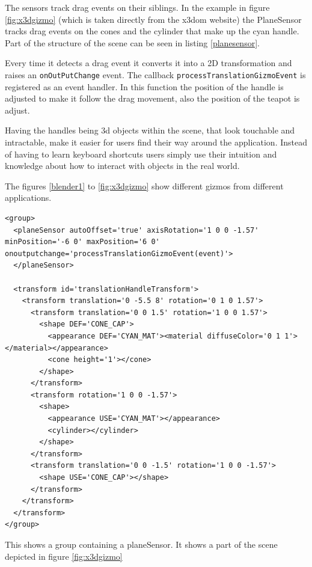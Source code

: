 The sensors track drag events on their siblings. In the example in figure
\ref{fig:x3dgizmo} (which is taken directly from the x3dom website) the
PlaneSensor tracks drag events on the cones and the cylinder that make up the
cyan handle. Part of the structure of the scene can be seen in listing
\ref{planesensor}.

Every time it detects a drag event it converts it into a 2D
transformation and raises an \texttt{onOutPutChange} event. The callback
\texttt{processTranslationGizmoEvent} is registered as an event handler.
In this function the position of the handle is adjusted to make it
follow the drag movement, also the position of the teapot is adjust.

Having the handles being 3d objects within the scene, that look
touchable and intractable, make it easier for users find their way
around the application. Instead of having to learn keyboard shortcuts
users simply use their intuition and knowledge about how to interact with
objects in the real world.

The figures \ref{blender1} to \ref{fig:x3dgizmo} show different gizmos from
different applications.

\begin{listing}
  \begin{verbatim}
<group>
  <planeSensor autoOffset='true' axisRotation='1 0 0 -1.57' minPosition='-6 0' maxPosition='6 0' onoutputchange='processTranslationGizmoEvent(event)'>
  </planeSensor>

  <transform id='translationHandleTransform'>
    <transform translation='0 -5.5 8' rotation='0 1 0 1.57'>
      <transform translation='0 0 1.5' rotation='1 0 0 1.57'>
        <shape DEF='CONE_CAP'>
          <appearance DEF='CYAN_MAT'><material diffuseColor='0 1 1'></material></appearance>
          <cone height='1'></cone>
        </shape>
      </transform>
      <transform rotation='1 0 0 -1.57'>
        <shape>
          <appearance USE='CYAN_MAT'></appearance>
          <cylinder></cylinder>
        </shape>
      </transform>
      <transform translation='0 0 -1.5' rotation='1 0 0 -1.57'>
        <shape USE='CONE_CAP'></shape>
      </transform>
    </transform>
  </transform>
</group>
  \end{verbatim}
  \caption{This shows a group containing a planeSensor. It shows a part of the scene depicted in figure \ref{fig:x3dgizmo}}
  \label{planesensor}
\end{listing}

